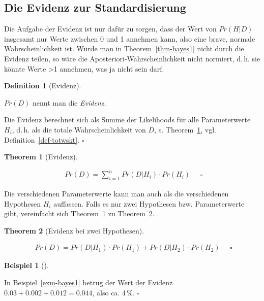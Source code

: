 \documentclass[
  ngerman,
  letterpaper,
  twoside,
  open=any]{scrbook}
\theoremstyle{definition}
\newtheorem{example}{Beispiel}[chapter]
\theoremstyle{plain}
\newtheorem{theorem}{Theorem}[chapter]
\theoremstyle{definition}
\theoremstyle{definition}
\newtheorem{definition}{Definition}[chapter]
\theoremstyle{definition}
\newtheorem{example}{Beispiel}[chapter]
\theoremstyle{definition}
\theoremstyle{remark}
\begin{document}
\subsection{Die Evidenz zur
Standardisierung}\label{die-evidenz-zur-standardisierung}

Die Aufgabe der Evidenz ist nur dafür zu sorgen, dass der Wert von
\(Pr(H|D)\) insgesamt nur Werte zwischen 0 und 1 annehmen kann, also
eine brave, normale Wahrscheinlichkeit ist. Würde man in
Theorem~\ref{thm-bayes1} nicht durch die Evidenz teilen, so wäre die
Aposteriori-Wahrscheinlichkeit nicht normiert, d.\,h. sie könnte Werte
\textgreater1 annehmen, was ja nicht sein darf.

\begin{definition}[Evidenz]\protect\hypertarget{def-evidenz}{}\label{def-evidenz}

\(Pr(D)\) nennt man die \emph{Evidenz}.

Die Evidenz berechnet sich als Summe der Likelihoods für alle
Parameterwerte \(H_i\), d.\,h. als die totale Wahrscheinlichkeit von
\(D\), s. Theorem~\ref{thm-evidenz}, vgl. Definition~\ref{def-totwskt}.
\(\square\)

\end{definition}

\begin{theorem}[Evidenz]\protect\hypertarget{thm-evidenz}{}\label{thm-evidenz}

\[
\begin{aligned}
Pr(D) = \sum_{i=1}^n Pr(D|H_i) \cdot Pr(H_i)
\end{aligned}\quad \square
\]

\end{theorem}

Die verschiedenen Parameterwerte kann man auch als die verschiedenen
Hypothesen \(H_i\) auffassen. Falls es nur zwei Hypothesen bzw.
Parameterwerte gibt, vereinfacht sich Theorem~\ref{thm-evidenz} zu
Theorem~\ref{thm-evidenz2}.

\begin{theorem}[Evidenz bei zwei
Hypothesen]\protect\hypertarget{thm-evidenz2}{}\label{thm-evidenz2}

\[
\begin{aligned}
Pr(D) = Pr(D|H_1) \cdot Pr(H_1) + Pr(D|H_2) \cdot Pr(H_2)
\end{aligned}\quad \square
\]

\end{theorem}

\begin{example}[]\protect\hypertarget{exm-evidenz1}{}\label{exm-evidenz1}

In Beispiel~\ref{exm-bayes1} betrug der Wert der Evidenz
\(0.03 + 0.002 + 0.012 = 0.044\), also ca. 4\,\%. \(\square\)

\end{example}
\end{document}
